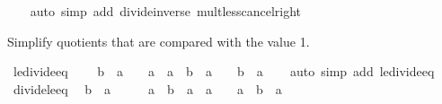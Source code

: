 \begin{isabellebody}
%
\isadelimproof
\ \ %
\endisadelimproof
%
\isatagproof
{}\isamarkupfalse%
\ {\isacharparenleft}{\kern0pt}auto\ simp\ add{\isacharcolon}{\kern0pt}\ divide{\isacharunderscore}{\kern0pt}inverse\ mult{\isacharunderscore}{\kern0pt}less{\isacharunderscore}{\kern0pt}cancel{\isacharunderscore}{\kern0pt}right{\isacharparenright}{\kern0pt}%
\endisatagproof
{\isafoldproof}%
%
\isadelimproof
%
\endisadelimproof
%
\begin{isamarkuptext}%
Simplify quotients that are compared with the value 1.%
\end{isamarkuptext}\isamarkuptrue%
\isamarkupfalse%
\ le{\isacharunderscore}{\kern0pt}divide{\isacharunderscore}{\kern0pt}eq{\isacharunderscore}{\kern0pt}{}{\isacharcolon}{\kern0pt}\isanewline
\ \ {\isachardoublequoteopen}{\isacharparenleft}{\kern0pt}{}\ {\isasymle}\ b\ {\isacharslash}{\kern0pt}\ a{\isacharparenright}{\kern0pt}\ {\isacharequal}{\kern0pt}\ {\isacharparenleft}{\kern0pt}{\isacharparenleft}{\kern0pt}{}\ {\isacharless}{\kern0pt}\ a\ {\isasymand}\ a\ {\isasymle}\ b{\isacharparenright}{\kern0pt}\ {\isasymor}\ {\isacharparenleft}{\kern0pt}a\ {\isacharless}{\kern0pt}\ {}\ {\isasymand}\ b\ {\isasymle}\ a{\isacharparenright}{\kern0pt}{\isacharparenright}{\kern0pt}{\isachardoublequoteclose}\isanewline
%
\isadelimproof
\ \ %
\endisadelimproof
%
\isatagproof
{}\isamarkupfalse%
\ {\isacharparenleft}{\kern0pt}auto\ simp\ add{\isacharcolon}{\kern0pt}\ le{\isacharunderscore}{\kern0pt}divide{\isacharunderscore}{\kern0pt}eq{\isacharparenright}{\kern0pt}%
\endisatagproof
{\isafoldproof}%
%
\isadelimproof
\isanewline
%
\endisadelimproof
\isanewline
{}\isamarkupfalse%
\ divide{\isacharunderscore}{\kern0pt}le{\isacharunderscore}{\kern0pt}eq{\isacharunderscore}{\kern0pt}{}{\isacharcolon}{\kern0pt}\isanewline
\ \ {\isachardoublequoteopen}{\isacharparenleft}{\kern0pt}b\ {\isacharslash}{\kern0pt}\ a\ {\isasymle}\ {}{\isacharparenright}{\kern0pt}\ {\isacharequal}{\kern0pt}\ {\isacharparenleft}{\kern0pt}{\isacharparenleft}{\kern0pt}{}\ {\isacharless}{\kern0pt}\ a\ {\isasymand}\ b\ {\isasymle}\ a{\isacharparenright}{\kern0pt}\ {\isasymor}\ {\isacharparenleft}{\kern0pt}a\ {\isacharless}{\kern0pt}\ {}\ {\isasymand}\ a\ {\isasymle}\ b{\isacharparenright}{\kern0pt}\ {\isasymor}\ a{\isacharequal}{\kern0pt}{}{\isacharparenright}{\kern0pt}{\isachardoublequoteclose}\isanewline
%
\isadelimproof
\ \ %
\endisadelimproof
%
\isatagproof
{}\isamarkupfalse%

\end{isabellebody}

